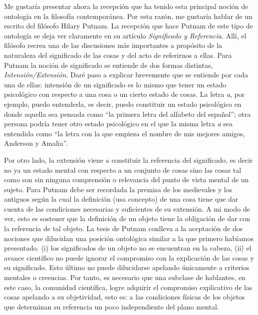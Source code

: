 \documentclass[]{book}
\begin{document}
Me gustaría presentar ahora la recepción que ha tenido esta principal
noción de ontología en la filosofía contemporánea. Por esta razón, me
gustaría hablar de un escrito del filósofo Hilary Putnam. La recepción
que hace Putnam de este tipo de ontología se deja ver claramente en su
artículo \emph{Significado y Referencia}. Allí, el filósofo recrea una
de las discusiones más importantes a propósito de la naturaleza del
significado de las cosas y del acto de referirnos a ellas. Para Putnam
la noción de significado se entiende de dos formas distintas,
\emph{Intensión/Extensión}. Daré paso a explicar brevemente que se
entiende por cada una de ellas: intensión de un significado es lo mismo
que tener un estado psicológico con respecto a una cosa o un cierto
estado de cosas. La letra \emph{a}, por ejemplo, puedo entenderla, es
decir, puedo constituir un estado psicológico en donde aquella sea
pensada como ``la primera letra del alfabeto del español''; otra persona
podría tener otro estado psicológico en el que la misma letra \emph{a}
sea entendida como ``la letra con la que empieza el nombre de mis
mejores amigos, Anderson y Amalia''.

Por otro lado, la extensión viene a constituir la referencia del
significado, es decir no ya un estado mental con respecto a un conjunto
de cosas sino las cosas tal como son sin ninguna comprensión o
relevancia del punto de vista mental de un sujeto. Para Putnam debe ser
recordada la premisa de los medievales y los antiguos según la cual la
definición (usa concepto) de una cosa tiene que dar cuenta de las
condiciones necesarias y suficientes de su extensión. A mi modo de ver,
esto es sostener que la definición de un objeto tiene la obligación de
dar con la referencia de tal objeto. La tesis de Putnam conlleva a la
aceptación de dos nociones que dilucidan una posición ontológica similar
a la que primero habíamos presentado. (i) los significados de un objeto
no se encuentran en la cabeza, (ii) el avance científico no puede
ignorar el compromiso con la explicación de las cosas y su significado.
Esto último no puede dilucidarse apelando únicamente a criterios
mentales o creencias. Por tanto, es necesario que una subclase de
hablantes, en este caso, la comunidad científica, logre adquirir el
compromiso explicativo de las cosas apelando a su objetividad, esto es:
a las condiciones físicas de los objetos que determinan su referencia un
poco independiente del plano mental.
\end{document}
